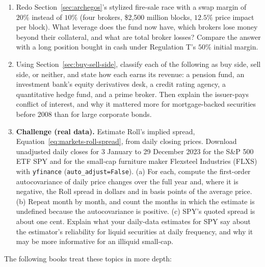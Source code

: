 \documentclass[../ai_in_finance]{subfiles}
\begin{document}
\begin{enumerate}[exercises]
    \item Redo Section~\ref{sec:archegos}'s stylized fire-sale race with a swap margin of $20\%$ instead of $10\%$ (four brokers, \$2,500 million blocks, $12.5\%$ price impact per block). What leverage does the fund now have, which brokers lose money beyond their collateral, and what are total broker losses? Compare the answer with a long position bought in cash under Regulation T's $50\%$ initial margin.
    \item Using Section~\ref{sec:buy-sell-side}, classify each of the following as buy side, sell side, or neither, and state how each earns its revenue: a pension fund, an investment bank's equity derivatives desk, a credit rating agency, a quantitative hedge fund, and a prime broker. Then explain the issuer-pays conflict of interest, and why it mattered more for mortgage-backed securities before 2008 than for large corporate bonds.
    \item \textbf{Challenge (real data).} Estimate Roll's implied spread, Equation~\eqref{eq:markets-roll-spread}, from daily closing prices. Download unadjusted daily closes for 3 January to 29 December 2023 for the S\&P 500 ETF SPY and for the small-cap furniture maker Flexsteel Industries (FLXS) with \texttt{yfinance} (\texttt{auto\_adjust=False}). (a) For each, compute the first-order autocovariance of daily price changes over the full year and, where it is negative, the Roll spread in dollars and in basis points of the average price. (b) Repeat month by month, and count the months in which the estimate is undefined because the autocovariance is positive. (c) SPY's quoted spread is about one cent. Explain what your daily-data estimates for SPY say about the estimator's reliability for liquid securities at daily frequency, and why it may be more informative for an illiquid small-cap.
\end{enumerate}


The following books treat these topics in more depth:
\end{document}
